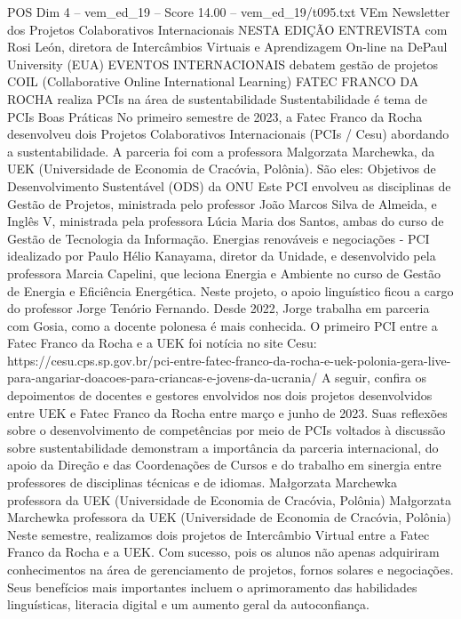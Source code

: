 \begin{textsample}{POS Dim 4 – vem\_ed\_19 – Score 14.00 – vem\_ed\_19/t095.txt}  \label{ex:f4_pos_108}
VEm Newsletter dos Projetos Colaborativos Internacionais NESTA EDIÇÃO ENTREVISTA com Rosi León, diretora de Intercâmbios Virtuais e Aprendizagem On-line na DePaul University (EUA) EVENTOS INTERNACIONAIS debatem gestão de projetos COIL (Collaborative Online International Learning) FATEC FRANCO DA ROCHA realiza PCIs na área de sustentabilidade Sustentabilidade é tema de PCIs Boas Práticas No primeiro semestre de 2023, a Fatec Franco da Rocha desenvolveu dois Projetos Colaborativos Internacionais (PCIs / Cesu) abordando a sustentabilidade.
A parceria foi com a professora Malgorzata Marchewka, da UEK (Universidade de Economia de Cracóvia, Polônia).
São eles: Objetivos de Desenvolvimento Sustentável (ODS) da ONU Este PCI envolveu as disciplinas de Gestão de Projetos, ministrada pelo professor João Marcos Silva de Almeida, e Inglês V, ministrada pela professora Lúcia Maria dos Santos, ambas do curso de Gestão de Tecnologia da Informação.
Energias renováveis e negociações - PCI idealizado por Paulo Hélio Kanayama, diretor da Unidade, e desenvolvido pela professora Marcia Capelini, que leciona Energia e Ambiente no curso de Gestão de Energia e Eficiência Energética.
Neste projeto, o apoio linguístico ficou a cargo do professor Jorge Tenório Fernando.
Desde 2022, Jorge trabalha em parceria com Gosia, como a docente polonesa é mais conhecida.
O primeiro PCI entre a Fatec Franco da Rocha e a UEK foi notícia no site Cesu: https://cesu.cps.sp.gov.br/pci-entre-fatec-franco-da-rocha-e-uek-polonia-gera-live-para-angariar-doacoes-para-criancas-e-jovens-da-ucrania/ A seguir, confira os depoimentos de docentes e gestores envolvidos nos dois projetos desenvolvidos entre UEK e Fatec Franco da Rocha entre março e junho de 2023.
Suas reflexões sobre o desenvolvimento de competências por meio de PCIs voltados à discussão sobre sustentabilidade demonstram a importância da parceria internacional, do apoio da Direção e das Coordenações de Cursos e do trabalho em sinergia entre professores de disciplinas técnicas e de idiomas.
Małgorzata Marchewka professora da UEK (Universidade de Economia de Cracóvia, Polônia) Małgorzata Marchewka professora da UEK (Universidade de Economia de Cracóvia, Polônia) Neste semestre, realizamos dois projetos de Intercâmbio Virtual entre a Fatec Franco da Rocha e a UEK.
Com sucesso, pois os alunos não apenas adquiriram conhecimentos na área de gerenciamento de projetos, fornos solares e negociações.
Seus benefícios mais importantes incluem o aprimoramento das habilidades linguísticas, literacia digital e um aumento geral da autoconfiança.

\end{textsample}
